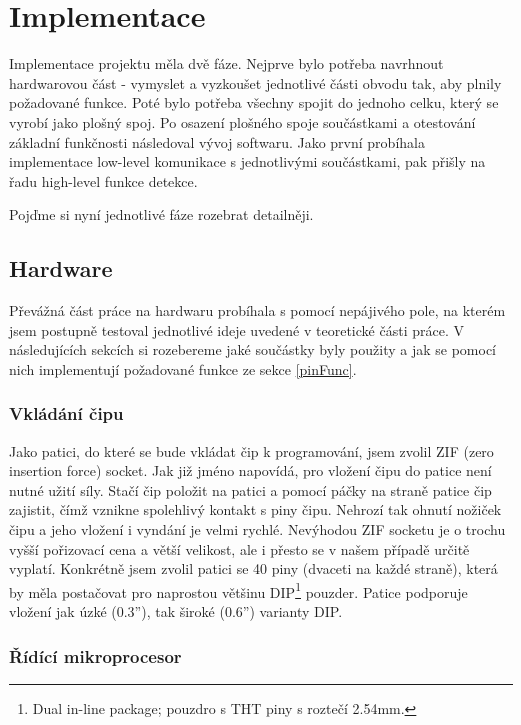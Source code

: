 \documentclass[11pt,a4paper,twoside,openright]{report}
\begin{document}


\chapter{Implementace}

Implementace projektu měla dvě fáze. Nejprve bylo potřeba navrhnout hardwarovou část - vymyslet a vyzkoušet jednotlivé části obvodu tak, aby plnily požadované funkce. Poté bylo potřeba všechny spojit do jednoho celku, který se vyrobí jako plošný spoj. Po osazení plošného spoje součástkami a otestování základní funkčnosti následoval vývoj softwaru. Jako první probíhala implementace low-level komunikace s jednotlivými součástkami, pak přišly na řadu high-level funkce detekce. 

Pojďme si nyní jednotlivé fáze rozebrat detailněji.

\section {Hardware}

Převážná část práce na hardwaru probíhala s pomocí nepájivého pole, na kterém jsem postupně testoval jednotlivé ideje uvedené v teoretické části práce. V následujících sekcích si rozebereme jaké součástky byly použity a jak se pomocí nich implementují požadované funkce ze sekce \ref{pinFunc}.

\subsection {Vkládání čipu}

Jako patici, do které se bude vkládat čip k programování, jsem zvolil ZIF (zero insertion force) socket. Jak již jméno napovídá, pro vložení čipu do patice není nutné užití síly. Stačí čip položit na patici a pomocí páčky na straně patice čip zajistit, čímž vznikne spolehlivý kontakt s piny čipu. Nehrozí tak ohnutí nožiček čipu a jeho vložení i vyndání je velmi rychlé. Nevýhodou ZIF socketu je o trochu vyšší pořizovací cena a větší velikost, ale i přesto se v našem případě určitě vyplatí. Konkrétně jsem zvolil patici se 40 piny (dvaceti na každé straně), která by měla postačovat pro naprostou většinu DIP\footnote{Dual in-line package; pouzdro s THT piny s roztečí 2.54mm.} pouzder. Patice podporuje vložení jak úzké (0.3''), tak široké (0.6'') varianty DIP.

\subsection {Řídící mikroprocesor}
\end{document}
